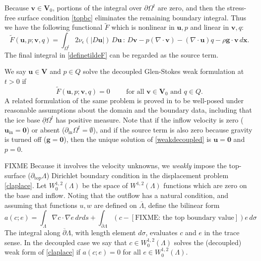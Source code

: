 \documentclass[letterpaper,final,12pt,reqno]{amsart}
\newcommand{\eps}{\epsilon}
\newcommand{\grad}{\nabla}
\newcommand{\bg}{\mathbf{g}}
\newcommand{\bu}{\mathbf{u}}
\newcommand{\bv}{\mathbf{v}}
\newcommand{\bx}{\mathbf{x}}
\newcommand{\bV}{\mathbf{V}}
\newcommand{\bzero}{\bm{0}}
\begin{document}
Because $\bv\in \bV_0$, portions of the integral over $\partial\Omega^t$ are zero, and then the stress-free surface condition \eqref{topbc} eliminates the remaining boundary integral.  Thus we have the following functional $\tilde F$ which is nonlinear in $\bu,p$ and linear in $\bv,q$:
\begin{equation}
\tilde F(\bu,p;\bv,q) = \int_{\Omega^t} 2 \nu_\eps(|D\bu|)\, D\bu\,:\,D\bv - p (\nabla \cdot \bv) - \left(\nabla \cdot \bu\right) q - \rho \mathbf{g} \cdot \bv \,d\bx. \label{definetildeF}
\end{equation}
The final integral in \eqref{definetildeF} can be regarded as the source term.

We say $\bu\in \bV$ and $p\in Q$ solve the decoupled Glen-Stokes weak formulation at $t>0$ if
\begin{equation}
\tilde F(\bu,p;\bv,q) = 0 \qquad \text{ for all } \bv\in \bV_0 \text{ and } q\in Q.  \label{weakdecoupled}
\end{equation}
A related formulation of the same problem is proved in \cite[Theorem 3.8]{JouvetRappaz2011} to be well-posed under reasonable assumptions about the domain and the boundary data, including that the ice base $\underline{\partial} \Omega^t$ has positive measure.  Note that if the inflow velocity is zero ($\bu_{\text{in}}=\bzero$) or absent ($\partial_{\text{in}} \Omega^t = \emptyset$), and if the source term is also zero because gravity is turned off ($\bg=\bzero$), then the unique solution of \eqref{weakdecoupled} is $\bu=\bzero$ and $p=0$.

FIXME Because it involves the velocity unknowns, we \emph{weakly} impose the top-surface ($\partial_{\text{top}} \Lambda$) Dirichlet boundary condition in the displacement problem \eqref{claplace}.  Let $W_0^{1,2}(\Lambda)$ be the space of $W^{1,2}(\Lambda)$ functions which are zero on the base and inflow.  Noting that the outflow has a natural condition, and assuming that functions $u,w$ are defined on $\overline\Lambda$, define the bilinear form
\begin{equation}
a(c;e) = \int_\Lambda \grad c \cdot \grad e \,dr ds + \int_{\overline{\partial} \Lambda} \left(c - [\text{FIXME: the top boundary value}]\right) e\,d\sigma \label{surfaceweakform}
\end{equation}
The integral along $\overline{\partial} \Lambda$, with length element $d\sigma$, evaluates $c$ and $e$ in the trace sense.  In the decoupled case we say that $c \in W_0^{1,2}(\Lambda)$ solves the (decoupled) weak form of \eqref{claplace} if $a(c;e)=0$ for all $e \in W_0^{1,2}(\Lambda)$.
\end{document}
